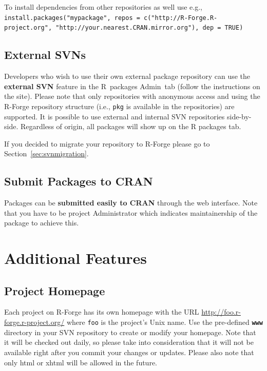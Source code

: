 \documentclass[a4paper]{article}
\let\code=\texttt
\newcommand{\proglang}[1]{\textsf{#1}}
\begin{document}
To install dependencies from other repositories as well use e.g.,
\code{install.packages("mypackage", repos = c("http://R-Forge.R-project.org",
"http://your.nearest.CRAN.mirror.org"), dep = TRUE)}

\subsection{External SVNs}
Developers who wish to use their own external package repository can
use the \textbf{external SVN} feature in the R~packages Admin~tab
(follow the instructions on the site). Please note that only
repositories with anonymous access and using the \proglang{R}-Forge repository
structure (i.e., \texttt{pkg} is available in the repositories) are
supported. It is possible to use 
external and internal SVN repositories side-by-side. Regardless of
origin, all packages will show up on the R packages tab.

If you decided to migrate your repository to \proglang{R}-Forge please go to
Section~\ref{sec:svnmigration}.

\subsection{Submit Packages to CRAN}
Packages can be \textbf{submitted easily to CRAN} through the web interface.
Note that you have to be project Administrator which indicates maintainership
of the package to achieve this. 


\section{Additional Features}

\subsection{Project Homepage}
Each project on \proglang{R}-Forge has its own homepage with the URL
\url{http://foo.r-forge.r-project.org/} where \texttt{foo} is the
project's Unix name. Use the
pre-defined \textbf{\texttt{www}} directory in your SVN repository to
create or modify your homepage. Note that it will be checked out
daily, so please take into consideration that it will not be available
right after you commit your changes or updates. Please also note that
only html or xhtml will be allowed in the future.
\end{document}
